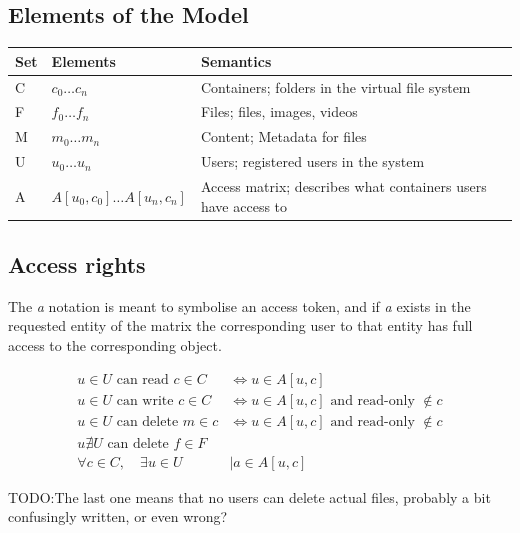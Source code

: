 \documentclass[a4paper,12pt]{article}
\newcommand{\Iff}{\Leftrightarrow}
\newcommand{\fix}{\colorbox{yellow!30}{TODO:}}
\begin{document}
\subsection{Elements of the Model}
\begin{center}
    \begin{tabular}{ | l | l | l | p{5cm} |}
        \hline
        \textbf{Set} & \textbf{Elements} & \textbf{Semantics} \\ \hline
        C   & $c_0\dots c_n$                & Containers; folders in the virtual file system\\ \hline
        F   & $f_0\dots f_n$                & Files; files, images, videos\\ \hline
        M   & $m_0\dots m_n$                & Content; Metadata for files\\ \hline
        U   & $u_0\dots u_n$                & Users; registered users in the system\\ \hline
        A   & $A[u_0,c_0]\dots A[u_n, c_n]$ & Access matrix; describes what containers users have access to\\ \hline
    \end{tabular}
\end{center}


\subsection{Access rights}
The \textit{a} notation is meant to symbolise an access token, and if \textit{a} exists in the
requested entity of the matrix the corresponding user to that entity has full access to the
corresponding object.

\begin{equation}
    \begin{split}
        u \in U \text{ can read } c \in C & \Iff u \in A[u,c] \\
        u \in U \text{ can write } c \in C & \Iff u \in A[u,c] \text{ and read-only } \notin c \\
        u \in U \text{ can delete } m \in c & \Iff u \in A[u,c] \text{ and read-only } \notin c \\
        u \nexists U \text{ can delete } f \in F \\
        \forall c \in C, \quad \exists u \in U & \mid a \in A[u,c] 
    \end{split}
\end{equation}

\fix The last one means that no users can delete actual files, probably a bit confusingly written, 
or even wrong?
\end{document}

